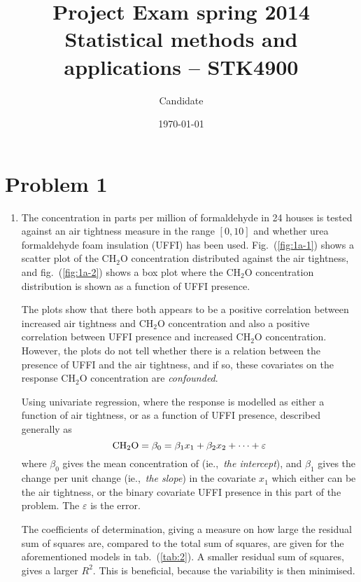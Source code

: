 \documentclass[a4paper,11pt]{article}
\date{\today}
\title{Project Exam spring 2014\\ \small{Statistical methods and applications -- STK4900}}
\author{Candidate}
\newcommand{\CHHO}{\text{CH\ensuremath{_2}O} }
\begin{document}
\onecolumn
\maketitle{}


\section*{Problem 1}

\begin{enumerate}[label=\alph*)]
    \item The concentration in parts per million of formaldehyde in 24 houses is tested against an air tightness measure in the range $[0,10]$ and whether urea formaldehyde foam insulation (UFFI) has been used. Fig.~(\ref{fig:1a-1}) shows a scatter plot of the CH$_2$O concentration distributed against the air tightness, and fig.~(\ref{fig:1a-2}) shows a box plot where the CH$_2$O concentration distribution is shown as a function of UFFI presence. 

        The plots show that there both appears to be a positive correlation between increased air tightness and CH$_2$O concentration and also a positive correlation between UFFI presence and increased CH$_2$O concentration. However, the plots do not tell whether there is a relation between the presence of UFFI and the air tightness, and if so, these covariates on the response CH$_2$O concentration are \textit{confounded}. 

        Using univariate regression, where the response \CHHO is modelled as either a function of air tightness, or as a function of UFFI presence, described generally as
        \begin{equation}
            {\rm CH_2O} = \beta_0 = \beta_1 x_1 + \beta_2 x_2 + \dots + \varepsilon
            \label{eq:linmod}
        \end{equation}
        where $\beta_0$ gives the mean concentration of \CHHO (ie.,~\textit{the intercept}), and $\beta_1$ gives the change per unit change (ie.,~\textit{the slope}) in the covariate $x_1$ which either can be the air tightness, or the binary covariate UFFI presence in this part of the problem. The $\varepsilon$ is the error. 

        The coefficients of determination, giving a measure on how large the residual sum of squares are, compared to the total sum of squares, are given for the aforementioned models in tab.~(\ref{tab:2}). A smaller residual sum of squares, gives a larger $R^2$.  This is beneficial, because the variability is then minimised.


\end{enumerate}
\end{document}
